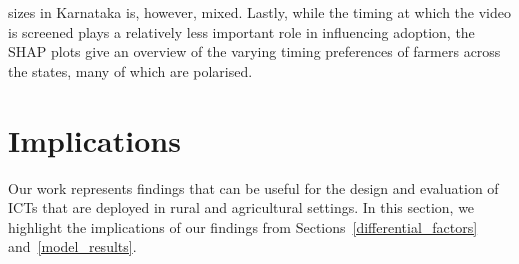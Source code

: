 \documentclass[manuscript,screen]{acmart}
\begin{document}
sizes in Karnataka is, however, mixed. Lastly, while the timing at which the video is screened plays a relatively less important role in influencing adoption, the SHAP plots give an overview of the varying timing preferences of farmers across the states, many of which are polarised.

\section{Implications} \label{implications}

Our work represents findings that can be useful for the design and evaluation of ICTs that are deployed in rural and agricultural settings. In this section, we highlight the implications of our findings from Sections~\ref{differential_factors} and~\ref{model_results}.
\end{document}
